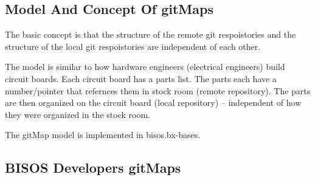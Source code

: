 \begin{comment}
**  [[elisp:(org-cycle)][| ]] [[elisp:(org-show-subtree)][|=]] [[elisp:(show-children 10)][|V]] [[elisp:(bx:orgm:indirectBufOther)][|>]] [[elisp:(bx:orgm:indirectBufMain)][|I]] [[elisp:(blee:ppmm:org-mode-toggle)][|N]] [[elisp:(org-top-overview)][|O]] [[elisp:(progn (org-shifttab) (org-content))][|C]] [[elisp:(delete-other-windows)][|1]]  /Subsection/   Model And Concept Of gitMaps ::  [[elisp:(org-cycle)][| ]]
\end{comment}

\subsection{Model And Concept Of gitMaps}
\label{sec:ModelAndConceptOfgitMaps}

The basic concept is that the structure of the remote git respoistories and 
the structure of the local git respoistories are independent of each other.

The model is similar to how hardware engineers (electrical engineers)
build circuit boards. Each circuit board has a parts list. The parts
each have a number/pointer that refernces them in stock room (remote
repository).  The parts are then organized on the circuit board (local
repository) -- independent of how they were organized in the stock
room.

The gitMap model is implemented in bisos.bx-bases.

\begin{comment}
**  [[elisp:(org-cycle)][| ]] [[elisp:(org-show-subtree)][|=]] [[elisp:(show-children 10)][|V]] [[elisp:(bx:orgm:indirectBufOther)][|>]] [[elisp:(bx:orgm:indirectBufMain)][|I]] [[elisp:(blee:ppmm:org-mode-toggle)][|N]] [[elisp:(org-top-overview)][|O]] [[elisp:(progn (org-shifttab) (org-content))][|C]] [[elisp:(delete-other-windows)][|1]]  /Subsection/   BISOS Developers gitMaps ::  [[elisp:(org-cycle)][| ]]
\end{comment}

\subsection{BISOS Developers gitMaps}
\label{sec:BISOSDevelopersgitMaps}


